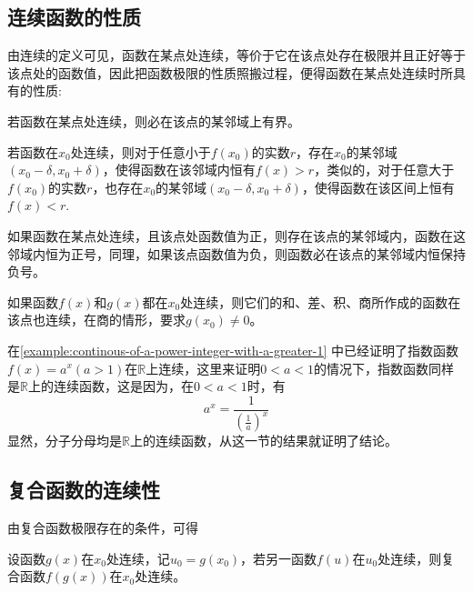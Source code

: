 \subsection{连续函数的性质}
\label{sec:properties-of-continuous-function}


由连续的定义可见，函数在某点处连续，等价于它在该点处存在极限并且正好等于该点处的函数值，因此把函数极限的性质照搬过程，便得函数在某点处连续时所具有的性质:
\begin{theorem}[局部有界性]
  若函数在某点处连续，则必在该点的某邻域上有界。
\end{theorem}

\begin{theorem}[局部保号性]
  若函数在$x_0$处连续，则对于任意小于$f(x_0)$的实数$r$，存在$x_0$的某邻域$(x_0-\delta,x_0+\delta)$，使得函数在该邻域内恒有$f(x)>r$，类似的，对于任意大于$f(x_0)$的实数$r$，也存在$x_0$的某邻域$(x_0-\delta,x_0+\delta)$，使得函数在该区间上恒有$f(x)<r$.
\end{theorem}

\begin{inference}
  如果函数在某点处连续，且该点处函数值为正，则存在该点的某邻域内，函数在这邻域内恒为正号，同理，如果该点函数值为负，则函数必在该点的某邻域内恒保持负号。
\end{inference}

\begin{theorem}
  如果函数$f(x)$和$g(x)$都在$x_0$处连续，则它们的和、差、积、商所作成的函数在该点也连续，在商的情形，要求$g(x_0) \neq 0$。
\end{theorem}

\begin{example}
  \label{example:continous-of-power-function}
  在\autoref{example:continous-of-a-power-integer-with-a-greater-1} 中已经证明了指数函数$f(x)=a^x(a>1)$在$\mathbb{R}$上连续，这里来证明$0<a<1$的情况下，指数函数同样是$\mathbb{R}$上的连续函数，这是因为，在$0<a<1$时，有
  \[ a^x = \frac{1}{\left( \frac{1}{a} \right)^x} \]
  显然，分子分母均是$\mathbb{R}$上的连续函数，从这一节的结果就证明了结论。
\end{example}

\subsection{复合函数的连续性}
\label{sec:continuousness-of-composite-function}

由复合函数极限存在的条件，可得
\begin{theorem}[复合函数的连续性]
  \label{theorem:the-continuity-of-combine-function}
  设函数$g(x)$在$x_0$处连续，记$u_0=g(x_0)$，若另一函数$f(u)$在$u_0$处连续，则复合函数$f(g(x))$在$x_0$处连续。
\end{theorem}


